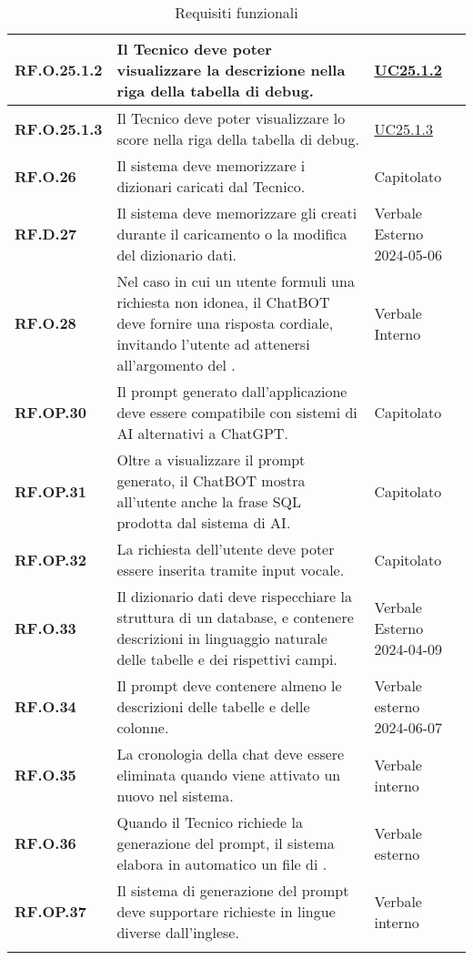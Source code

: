 \begin{longtable}{|P{3cm}|P{6,5cm}|>{\arraybackslash}P{4cm}|}
    \textbf{RF.O.25.1.2} & Il Tecnico deve poter visualizzare la descrizione nella riga della tabella di debug. &  \hyperref[UC25poin1point2]{UC25.1.2}\\
    \hline
    \textbf{RF.O.25.1.3} & Il Tecnico deve poter visualizzare lo score nella riga della tabella di debug. &  \hyperref[UC25poin1point3]{UC25.1.3}\\
    \hline
    \textbf{RF.O.26} & Il sistema deve memorizzare i dizionari caricati dal Tecnico. & Capitolato \\
    \hline
    \textbf{RF.D.27} & Il sistema deve memorizzare gli  creati durante il caricamento o la modifica del dizionario dati. & Verbale Esterno 2024-05-06 \\
    \hline
    \textbf{RF.O.28} & Nel caso in cui un utente formuli una richiesta non idonea, il ChatBOT deve fornire una risposta cordiale, invitando l'utente ad attenersi all'argomento del . & Verbale Interno \\
    \hline
    \textbf{RF.OP.30} & Il prompt generato dall'applicazione deve essere compatibile con sistemi di AI alternativi a ChatGPT. & Capitolato \\
    \hline
    \textbf{RF.OP.31} & Oltre a visualizzare il prompt generato, il ChatBOT mostra all'utente anche la frase SQL prodotta dal sistema di AI. & Capitolato \\
    \hline
    \textbf{RF.OP.32} & La richiesta dell'utente deve poter essere inserita tramite input vocale. & Capitolato \\
    \hline
    \hline
    \textbf{RF.O.33} & Il dizionario dati deve rispecchiare la struttura di un database, e contenere descrizioni in linguaggio naturale delle tabelle e dei rispettivi campi. & Verbale Esterno 2024-04-09 \\
    \hline
    \textbf{RF.O.34} & Il prompt deve contenere almeno le descrizioni delle tabelle e delle colonne. & Verbale esterno 2024-06-07 \\
    \hline
    \textbf{RF.O.35} & La cronologia della chat deve essere eliminata quando viene attivato un nuovo  nel sistema. & Verbale interno \\
    \hline
    \textbf{RF.O.36} & Quando il Tecnico richiede la generazione del prompt, il sistema elabora in automatico un file di . & Verbale esterno \\
    \hline
    \textbf{RF.OP.37} & Il sistema di generazione del prompt deve supportare richieste in lingue diverse dall'inglese. & Verbale interno \\
    \hline
\caption{Requisiti funzionali}
\label{requisitifunzionali}
\end{longtable}

